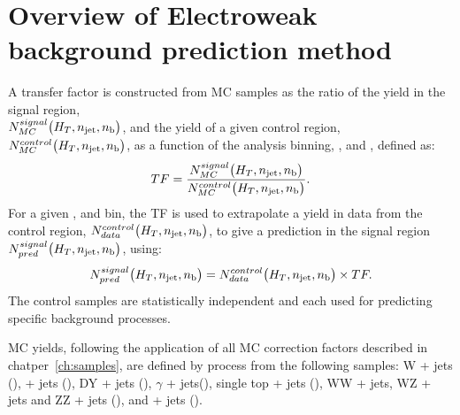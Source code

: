 \section{Overview of Electroweak background prediction method}  %
\label{sec:background_overview}

A transfer factor is constructed from MC samples as the ratio 
of the yield in the signal region, \\$N_{MC}^{signal}\big(H_T, n_{\text{jet}}, n_{\text{b}}\big)$,
and the yield of a given control region, \\$N_{MC}^{control}\big(H_T, n_{\text{jet}},
n_{\text{b}}\big)$, as a function of the analysis binning, \HT, \nj and \nb, defined as:
% 
\begin{equation}
TF = \frac{N_{MC}^{signal}\big(H_T, n_{\text{jet}}, n_{\text{b}}\big)}{N_{MC}^{control}\big(H_T, n_{\text{jet}}, n_{\text{b}}\big)} .
\label{eq:transfer_factor}
\end{equation}
% 
For a given \HT, \nj and \nb bin, the TF is used to extrapolate a yield in data from
the control region, $N_{data}^{control}\big(H_T, n_{\text{jet}}, n_{\text{b}}\big)$,
to give a prediction in the signal region $N_{pred}^{signal}\big(H_T, n_{\text{jet}},
n_{\text{b}}\big)$, using:
%
\begin{equation}
N_{pred}^{signal}\big(H_T, n_{\text{jet}}, n_{\text{b}}\big) = N_{data}^{control}\big(H_T, n_{\text{jet}}, n_{\text{b}}\big)
\times TF .
\label{eq:transfer_equation}
\end{equation}
% 
The control samples are statistically independent and each used for predicting 
specific background processes.

MC yields, following the application of all MC correction factors described in
chatper~\ref{ch:samples}, are defined by process from the following samples:
W + jets (\numw),
\ttbar + jets (\numtt), DY + jets (\numdy), $\gamma$ + jets(\numgam),
single top + jets (\numtop), WW + jets, WZ + jets and ZZ + jets (\numdibo), and
\zinv + jets (\numzinv).


